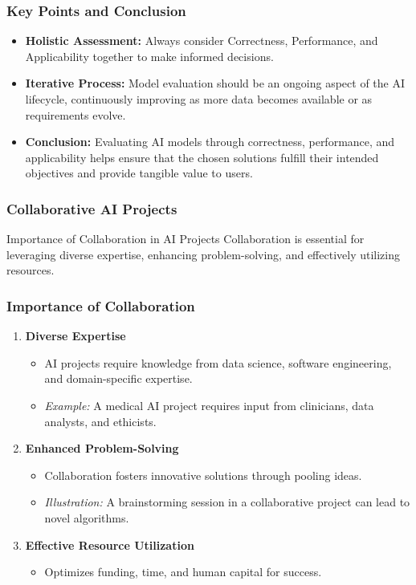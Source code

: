 \documentclass[aspectratio=169]{beamer}
\begin{document}
\begin{frame}[fragile]
    \frametitle{Key Points and Conclusion}
    \begin{itemize}
        \item \textbf{Holistic Assessment:} Always consider Correctness, Performance, and Applicability together to make informed decisions.
        \item \textbf{Iterative Process:} Model evaluation should be an ongoing aspect of the AI lifecycle, continuously improving as more data becomes available or as requirements evolve.
        \item \textbf{Conclusion:} Evaluating AI models through correctness, performance, and applicability helps ensure that the chosen solutions fulfill their intended objectives and provide tangible value to users.
    \end{itemize}
\end{frame}

\begin{frame}[fragile]
    \frametitle{Collaborative AI Projects}
    \begin{block}{Importance of Collaboration in AI Projects}
        Collaboration is essential for leveraging diverse expertise, enhancing problem-solving, and effectively utilizing resources.
    \end{block}
\end{frame}

\begin{frame}[fragile]
    \frametitle{Importance of Collaboration}
    \begin{enumerate}
        \item \textbf{Diverse Expertise} 
        \begin{itemize}
            \item AI projects require knowledge from data science, software engineering, and domain-specific expertise.
            \item \textit{Example:} A medical AI project requires input from clinicians, data analysts, and ethicists.
        \end{itemize}

        \item \textbf{Enhanced Problem-Solving}
        \begin{itemize}
            \item Collaboration fosters innovative solutions through pooling ideas.
            \item \textit{Illustration:} A brainstorming session in a collaborative project can lead to novel algorithms.
        \end{itemize}

        \item \textbf{Effective Resource Utilization}
        \begin{itemize}
            \item Optimizes funding, time, and human capital for success.
        \end{itemize}
    \end{enumerate}
\end{frame}
\end{document}
